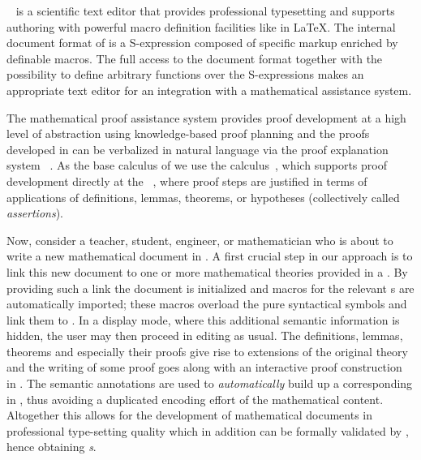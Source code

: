 {\texmacs}~\cite{VdH01} is a scientific {} text editor that provides
professional typesetting and supports authoring with powerful macro definition facilities
like in {\LaTeX}. The internal document format of {\texmacs} is a {}
S-expression composed of {\texmacs} specific markup enriched by definable macros.  The
full access to the document format together with the possibility to define arbitrary
{} functions over the S-expressions makes {\texmacs} an appropriate text
editor for an integration with a mathematical assistance system.

The mathematical proof assistance system {\OMEGA} \cite{OMEGA02,SBA-05-a} provides proof
development at a high level of abstraction using knowledge-based proof planning and the
proofs developed in {\OMEGA} can be verbalized in natural language via the proof
explanation system {\prex}~\cite{Fiedler-01-a}.  As the base calculus of {\OMEGA} we use
the {\CORE} calculus~\cite{Aut03,Aut-05-a}, which supports proof development directly at
the {\emph{}}~\cite{Hu-96-a}, where proof steps are justified in
terms of applications of definitions, lemmas, theorems, or hypotheses (collectively called
{\emph{assertions}}).

Now, consider a teacher, student, engineer, or mathematician who is about to write a new
mathematical document in {\texmacs}. A first crucial step in our approach is to link this
new document to one or more mathematical theories provided in a
{}.  By providing such a link the document
is initialized and {\texmacs} macros for the relevant {s}
are automatically imported; these macros overload the pure syntactical symbols and link
them to {}. In a {\texmacs} display mode, where this additional
semantic information is hidden, the user may then proceed in editing
{} as usual.  The definitions, lemmas, theorems and especially
their proofs give rise to extensions of the original theory and the writing of some proof
goes along with an interactive proof construction in {\OMEGA}. The semantic annotations
are used to {\emph{automatically}} build up a corresponding
{} in {\OMEGA}, thus avoiding a duplicated encoding effort
of the mathematical content.  Altogether this allows for the development of mathematical
documents in professional type-setting quality which in addition can be formally validated
by {\OMEGA}, hence obtaining {\emph{s}}.

